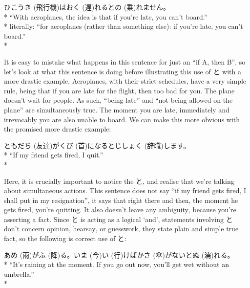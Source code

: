 \documentclass[11pt, b5paper, twoside, openright, onecolumn]{book}
\makeatletter
\newcommand*{\rubystack}[2]{{\relscale{0.5}%
  \begin{tabular}[b]{@{}c@{}}%
    {#1}\\%
   {\textscale{2}{#2}}%
  \end{tabular}}%
}
\DeclareRobustCommand*{\ruby}[2]{%
  \mbox{%
    \setlength{\parskip}{0ex}%
    \BeginAccSupp{method=pdfstringdef,ActualText={#1}}%
      \rubystack{\phantom{#2}}{#1}%
      \llap{%
        \rubystack{#2}{\phantom{#1}}%
      }%
    \EndAccSupp{}%
  }%
}
\renewcommand*{\ruby}[2]{#2 (#1)}%
\newenvironment{exampleblock}{
\setlength{\parindent}{0.6in}
\begin{minipage}[t]{\dimexpr\textwidth-\parindent}}
{\end{minipage}}
\makeatother
\begin{document}
\vspace{0.4cm}
\begin{exampleblock}
\ruby{飛行機}{ひこうき}は\ruby{遅}{おく}れると\ruby{乗}{の}れません。 \\* 
“With aeroplanes‚ the idea is that if you’re late‚ you can’t board.” \\* 
literally: “for aeroplanes (rather than something else): if you’re late‚ you can’t board.” \\* 
\end{exampleblock}
\vspace{0.2cm}

It is easy to mistake what happens in this sentence for just an “if A‚ then B”‚ so let’s look at what this sentence is doing before illustrating this use of と with a more drastic example. Aeroplanes‚ with their strict schedules‚ have a very simple rule‚ being that if you are late for the flight‚ then too bad for you. The plane doesn’t wait for people. As such‚ “being late” and “not being allowed on the plane” are simultaneously true. The moment you are late‚ immediately and irrevocably you are also unable to board. We can make this more obvious with the promised more drastic example:

\vspace{0.4cm}
\begin{exampleblock}
\ruby{友達}{ともだち}が\ruby{首}{くび}になると\ruby{辞職}{じしょく}します。 \\* 
“If my friend gets fired‚ I quit.” \\* 
\end{exampleblock}
\vspace{0.2cm}

Here‚ it is crucially important to notice the と‚ and realise that we’re talking about simultaneous actions. This sentence does not say “if my friend gets fired‚ I shall put in my resignation”‚ it says that right there and then‚ the moment he gets fired‚ you’re quitting. It also doesn’t leave any ambiguity‚ because you’re asserting a fact. Since と is acting as a logical ‘and’‚ statements involving と don’t concern opinion‚ hearsay‚ or guesswork‚ they state plain and simple true fact‚ so the following is correct use of と:

\vspace{0.4cm}
\begin{exampleblock}
\ruby{雨}{あめ}が\ruby{降}{ふ}る。\ruby{今}{いま}\ruby{行}{い}けば\ruby{傘}{かさ}がないと\ruby{濡}{ぬ}れる。 \\* 
“It’s raining at the moment. If you go out now‚ you’ll get wet without an umbrella.” \\* 
\end{exampleblock}
\vspace{0.2cm}
\end{document}
